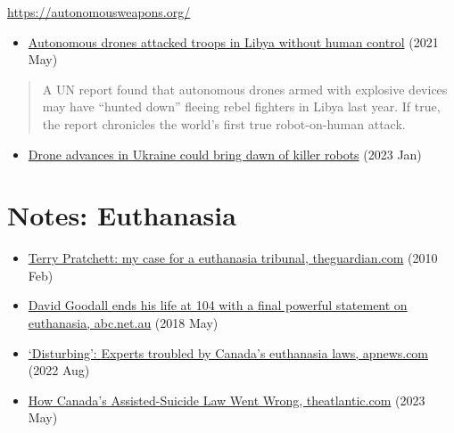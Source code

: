 \url{https://autonomousweapons.org/}

\begin{itemize}
\tightlist
\item
  \href{https://www.rt.com/news/525111-libya-killer-drone-attack/}{Autonomous
  drones attacked troops in Libya without human control} (2021 May)
\end{itemize}

\begin{quote}
A UN report found that autonomous drones armed with explosive devices
may have ``hunted down'' fleeing rebel fighters in Libya last year. If
true, the report chronicles the world's first true robot-on-human
attack.
\end{quote}

\begin{itemize}
\tightlist
\item
  \href{https://apnews.com/article/russia-ukraine-war-drone-advances-6591dc69a4bf2081dcdd265e1c986203}{Drone
  advances in Ukraine could bring dawn of killer robots} (2023 Jan)
\end{itemize}

\section{Notes: Euthanasia}

\begin{itemize}
\item
  \href{https://www.theguardian.com/society/2010/feb/02/terry-pratchett-assisted-suicide-tribunal}{Terry
  Pratchett: my case for a euthanasia tribunal, theguardian.com} (2010
  Feb)
\item
  \href{https://www.abc.net.au/news/2018-05-10/david-goodall-ends-life-in-a-powerful-statement-on-euthanasia/9742528}{David
  Goodall ends his life at 104 with a final powerful statement on
  euthanasia, abc.net.au} (2018 May)
\item
  \href{https://apnews.com/article/covid-science-health-toronto-7c631558a457188d2bd2b5cfd360a867}{`Disturbing':
  Experts troubled by Canada's euthanasia laws, apnews.com} (2022 Aug)
\item
  \href{https://www.theatlantic.com/magazine/archive/2023/06/canada-legalized-medical-assisted-suicide-euthanasia-death-maid/673790/}{How
  Canada's Assisted-Suicide Law Went Wrong, theatlantic.com} (2023 May)
\end{itemize}

